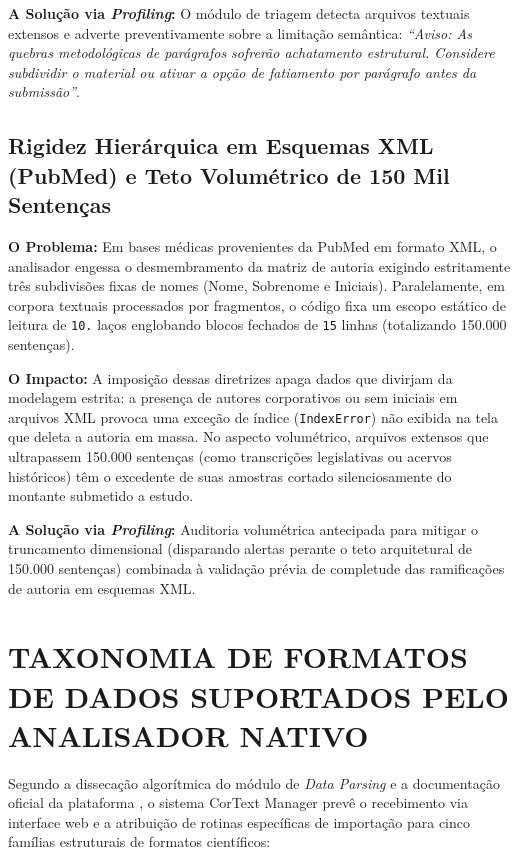 \documentclass[
	oneside,
	a4paper,
	12pt,
	chapter=TITLE,
	section=TITLE,
	english,
	brazilian
]{abntex2}
\begin{document}
\begin{apendicesenv}
\textbf{A Solução via \textit{Profiling}:} O módulo de triagem detecta arquivos textuais extensos e adverte preventivamente sobre a limitação semântica: \textit{``Aviso: As quebras metodológicas de parágrafos sofrerão achatamento estrutural. Considere subdividir o material ou ativar a opção de fatiamento por parágrafo antes da submissão''}.

\FloatBarrier
\subsection{Rigidez Hierárquica em Esquemas XML (PubMed) e Teto Volumétrico de 150 Mil Sentenças}\label{sec:rigidez_hierarquica_em_esquemas_xml_pubm}


\textbf{O Problema:} Em bases médicas provenientes da PubMed em formato XML, o analisador engessa o desmembramento da matriz de autoria exigindo estritamente três subdivisões fixas de nomes (Nome, Sobrenome e Iniciais). Paralelamente, em corpora textuais processados por fragmentos, o código fixa um escopo estático de leitura de \texttt{10.} laços englobando blocos fechados de \texttt{15} linhas (totalizando 150.000 sentenças).

\textbf{O Impacto:} A imposição dessas diretrizes apaga dados que divirjam da modelagem estrita: a presença de autores corporativos ou sem iniciais em arquivos XML provoca uma exceção de índice (\texttt{IndexError}) não exibida na tela que deleta a autoria em massa. No aspecto volumétrico, arquivos extensos que ultrapassem 150.000 sentenças (como transcrições legislativas ou acervos históricos) têm o excedente de suas amostras cortado silenciosamente do montante submetido a estudo.

\textbf{A Solução via \textit{Profiling}:} Auditoria volumétrica antecipada para mitigar o truncamento dimensional (disparando alertas perante o teto arquitetural de 150.000 sentenças) combinada à validação prévia de completude das ramificações de autoria em esquemas XML.

\FloatBarrier
\section{TAXONOMIA DE FORMATOS DE DADOS SUPORTADOS PELO ANALISADOR NATIVO}\label{sec:taxonomia_de_formatos_de_dados_suportado}


Segundo a dissecação algorítmica do módulo de \textit{Data Parsing} e a documentação oficial da plataforma \cite{CorText2026}, o sistema CorText Manager prevê o recebimento via interface web e a atribuição de rotinas específicas de importação para cinco famílias estruturais de formatos científicos:


\end{apendicesenv}
\end{document}
